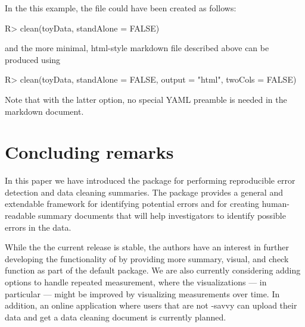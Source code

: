 \documentclass[article,shortnames]{jss}
\newcommand{\hl}[1]{\textcolor{magenta}{#1}}
\begin{document}
In the this example, the  file could have
been created as follows:

\begin{Schunk}
\begin{Sinput}
R> clean(toyData, standAlone = FALSE)
\end{Sinput}
\end{Schunk}

and the more minimal, html-style  markdown file described above can be produced using

\begin{Schunk}
\begin{Sinput}
R> clean(toyData, standAlone = FALSE, output = "html", twoCols = FALSE)
\end{Sinput}
\end{Schunk}

Note that with the latter option, no special YAML preamble is needed in the  markdown document.



\section{Concluding remarks}
\label{conclusion}

In this paper we have introduced the  package 
for performing reproducible error detection and data cleaning
summaries. The package provides a general and extendable framework for
identifying potential errors and for creating human-readable summary
documents that will help investigators to identify possible errors in
the data.


While the the current release is stable, the authors have an interest
in further developing the functionality of  by providing
more summary, visual, and check function as part of the default
package. We are also currently considering adding options to handle
repeated measurement, where the visualizations --- in particular ---
might be improved by visualizing measurements over time. In addition,
an online  \citep{shiny} application where users that are not
-savvy can upload their data and get a data cleaning
document is currently planned.
\end{document}
